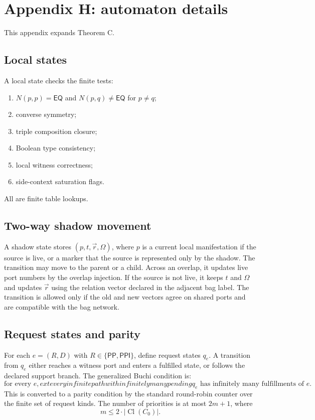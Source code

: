 \documentclass[11pt]{article}
\newcommand{\EQ}{\mathsf{EQ}}
\newcommand{\PP}{\mathsf{PP}}
\newcommand{\PPI}{\mathsf{PPI}}
\newcommand{\Cl}{\operatorname{Cl}}
\begin{document}
\section{Appendix H: automaton details}

This appendix expands Theorem C.

\subsection{Local states}

A local state checks the finite tests:
\begin{enumerate}[label=(L\arabic*)]
\item $N(p,p)=\EQ$ and $N(p,q)\ne\EQ$ for $p\ne q$;
\item converse symmetry;
\item triple composition closure;
\item Boolean type consistency;
\item local witness correctness;
\item side-context saturation flags.
\end{enumerate}
All are finite table lookups.

\subsection{Two-way shadow movement}

A shadow state stores $(p,t,\vec r,\Omega)$, where $p$ is a current local manifestation if the source is live, or a marker that the source is represented only by the shadow.  The transition may move to the parent or a child.  Across an overlap, it updates live port numbers by the overlap injection.  If the source is not live, it keeps $t$ and $\Omega$ and updates $\vec r$ using the relation vector declared in the adjacent bag label.  The transition is allowed only if the old and new vectors agree on shared ports and are compatible with the bag network.

\subsection{Request states and parity}

For each $e=(R,D)$ with $R\in\{\PP,\PPI\}$, define request states $q_e$.  A transition from $q_e$ either reaches a witness port and enters a fulfilled state, or follows the declared support branch.  The generalized Buchi condition is:
\[
\text{for every }e,	ext{ every infinite path with infinitely many pending }q_e
\text{ has infinitely many fulfillments of }e.
\]
This is converted to a parity condition by the standard round-robin counter over the finite set of request kinds.  The number of priorities is at most $2m+1$, where
\[
m\le 2\cdot |\Cl(C_0)|.
\]
\end{document}
